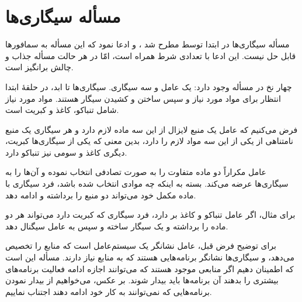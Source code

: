 \documentclass{book}
\begin{document}
\section {مسأله سیگاری‌ها}

    مسأله سیگاری‌ها در ابتدا توسط      مطرح شد \cite{patil}، و ادعا نمود که  این مسأله به سمافورها قابل حل نیست. 
    این ادعا با تعدادی شرط همراه است، امّا در هر حالت مسأله جذاب و چالش برانگیز است. 

    چهار نخ در مسأله وجود دارد: یک عامل و سه سیگاری. سیگاری‌ها تا ابد، در حلقهٔ ابتدا انتظار برای مواد مورد نیاز و سپس ساختن و کشیدن سیگار هستند.
    مواد مورد نیاز شامل تنباکو، کاغذ و کبریت است. 

    فرض می‌کنیم که عامل یک منبع لایزال از این سه ماده لازم دارد و هر سیگاری یک منبع نامتناهی از یکی از این سه مواد لازم را دارد، بدین معنی که 
    یکی از سیگاری‌ها کبریت، دیگری کاغذ و سومی نیز تنباکو دارد. 

    عامل مکراراً دو ماده متفاوت را به صورت تصادفی انتخاب نموده و آن‌ها را به سیگاری‌ها عرضه می‌کند. 
    بسته به اینکه چه موادی انتخاب شده باشد، فرد سیگاری با ماده مکمل خود می‌تواند دو منبع را برداشته و ادامه دهد. 

    برای مثال، اگر عامل تنباکو و کاغذ بر دارد، فرد سیگاری که کبریت دارد می‌تواند هر دو ماده را برداشته و یک سیگار ساخته و سپس به عامل سیگنال دهد. 

    برای توضیح فرض قبل،‌    
    عامل نشانگر یک سیستم‌عامل است که منابع را تخصیص می‌دهد، و سیگاری‌ها نشانگر برنامه‌هایی هستند که به منابع نیاز دارند. 
    مسأله این است که اطمینان دهیم اگر منابعی موجود هستند که می‌توانند اجازه ادامه فعالیت برنامه‌های بیشتری را بدهند آن برنامه‌ها باید بیدار شوند. 
    بر عکس، می‌خواهیم از بیدار نمودن برنامه‌هایی که نمی‌توانند به کار خود ادامه دهند اجتناب نماییم. 
\end{document}
